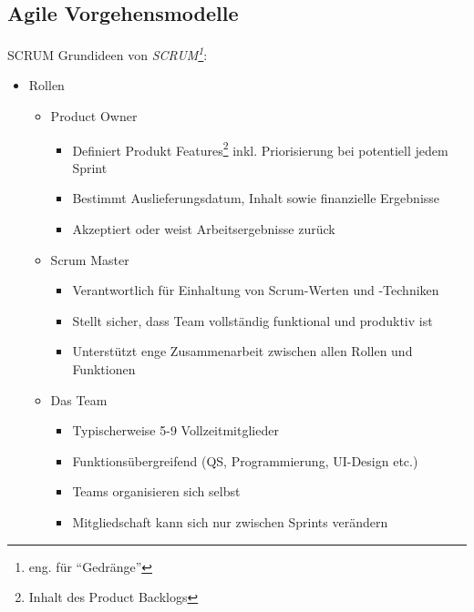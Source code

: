 \subsection{Agile Vorgehensmodelle}

\begin{defi}{SCRUM}
    Grundideen von \emph{SCRUM\footnote{eng. für \enquote{Gedränge}}}:
    \begin{itemize}
        \item Rollen
              \begin{itemize}
                  \item Product Owner
                        \begin{itemize}
                            \item Definiert Produkt Features\footnote{Inhalt des Product Backlogs} inkl. Priorisierung bei potentiell jedem Sprint
                            \item Bestimmt Auslieferungsdatum, Inhalt sowie finanzielle Ergebnisse
                            \item Akzeptiert oder weist Arbeitsergebnisse zurück
                        \end{itemize}
                  \item Scrum Master
                        \begin{itemize}
                            \item Verantwortlich für Einhaltung von Scrum-Werten und -Techniken
                            \item Stellt sicher, dass Team vollständig funktional und produktiv ist
                            \item Unterstützt enge Zusammenarbeit zwischen allen Rollen und Funktionen
                        \end{itemize}
                  \item Das Team
                        \begin{itemize}
                            \item Typischerweise 5-9 Vollzeitmitglieder
                            \item Funktionsübergreifend (QS, Programmierung, UI-Design etc.)
                            \item Teams organisieren sich selbst
                            \item Mitgliedschaft kann sich nur zwischen Sprints verändern
                        \end{itemize}

\end{itemize}
\end{itemize}
\end{defi}
